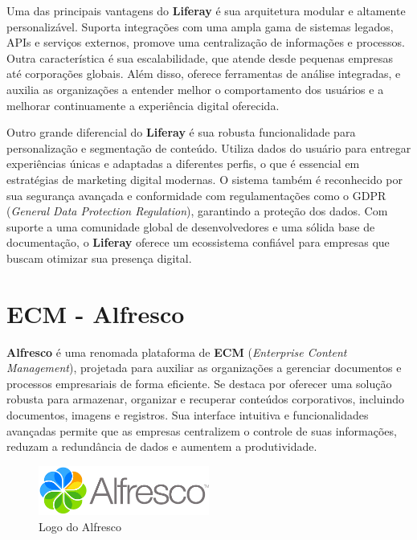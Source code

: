 \documentclass[a4paper,11pt]{article}
\begin{document}
Uma das principais vantagens do \textbf{Liferay} é sua arquitetura modular e altamente personalizável. Suporta integrações com uma ampla gama de sistemas legados, APIs e serviços externos, promove uma centralização de informações e processos. Outra característica é sua escalabilidade, que atende desde pequenas empresas até corporações globais. Além disso, oferece ferramentas de análise integradas, e auxilia as organizações a entender melhor o comportamento dos usuários e a melhorar continuamente a experiência digital oferecida.

Outro grande diferencial do \textbf{Liferay} é sua robusta funcionalidade para personalização e segmentação de conteúdo. Utiliza dados do usuário para entregar experiências únicas e adaptadas a diferentes perfis, o que é essencial em estratégias de marketing digital modernas. O sistema também é reconhecido por sua segurança avançada e conformidade com regulamentações como o GDPR (\textit{General Data Protection Regulation}), garantindo a proteção dos dados. Com suporte a uma comunidade global de desenvolvedores e uma sólida base de documentação, o \textbf{Liferay} oferece um ecossistema confiável para empresas que buscam otimizar sua presença digital.

\section{ECM - Alfresco}
\textbf{Alfresco} é uma renomada plataforma de \textbf{ECM} (\textit{Enterprise Content Management}), projetada para auxiliar as organizações a gerenciar documentos e processos empresariais de forma eficiente. Se destaca por oferecer uma solução robusta para armazenar, organizar e recuperar conteúdos corporativos, incluindo documentos, imagens e registros. Sua interface intuitiva e funcionalidades avançadas permite que as empresas centralizem o controle de suas informações, reduzam a redundância de dados e aumentem a produtividade.
\begin{figure}[!htb]
	\centering
	\includegraphics[width=0.5\textwidth]{imagens/LogoAlfresco}
	\caption{Logo do Alfresco}
\end{figure}
\end{document}
